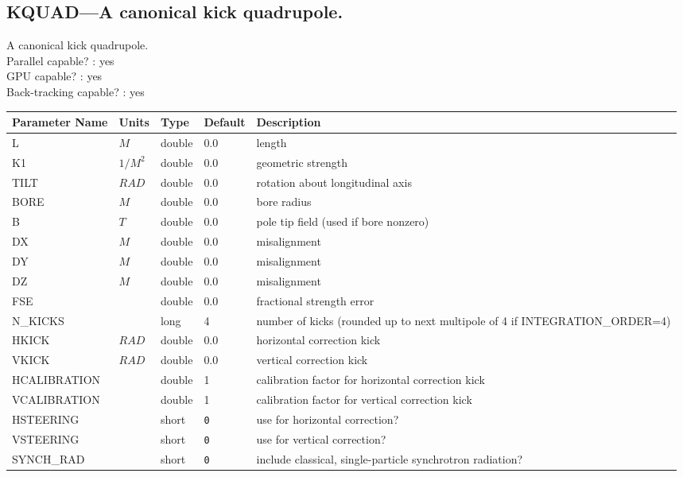 \subsection{KQUAD---A canonical kick quadrupole.}
A canonical kick quadrupole.
\\
Parallel capable? : yes\\
GPU capable? : yes\\
Back-tracking capable? : yes\\
\begin{tabular}{|l|l|l|l|p{\descwidth}|} \hline
Parameter Name & Units & Type & Default & Description \\ \hline 
L & $M$ & double &  0.0 & length  \\ \hline 
K1 & $1/M^{2}$ & double &  0.0 & geometric strength  \\ \hline 
TILT & $RAD$ & double &  0.0 & rotation about longitudinal axis  \\ \hline 
BORE & $M$ & double &  0.0 & bore radius  \\ \hline 
B & $T$ & double &  0.0 & pole tip field (used if bore nonzero)  \\ \hline 
DX & $M$ & double &  0.0 & misalignment  \\ \hline 
DY & $M$ & double &  0.0 & misalignment  \\ \hline 
DZ & $M$ & double &  0.0 & misalignment  \\ \hline 
FSE &  & double &  0.0 & fractional strength error  \\ \hline 
N\_KICKS &  & long &   4               & number of kicks (rounded up to next multipole of 4 if INTEGRATION\_ORDER=4)  \\ \hline 
HKICK & $RAD$ & double &  0.0 & horizontal correction kick  \\ \hline 
VKICK & $RAD$ & double &  0.0 & vertical correction kick  \\ \hline 
HCALIBRATION &  & double &   1 & calibration factor for horizontal correction kick  \\ \hline 
VCALIBRATION &  & double &   1 & calibration factor for vertical correction kick  \\ \hline 
HSTEERING &  & short &  \verb|0| & use for horizontal correction?  \\ \hline 
VSTEERING &  & short &  \verb|0| & use for vertical correction?  \\ \hline 
SYNCH\_RAD &  & short &  \verb|0| & include classical, single-particle synchrotron radiation?  \\ \hline 

\end{tabular}
